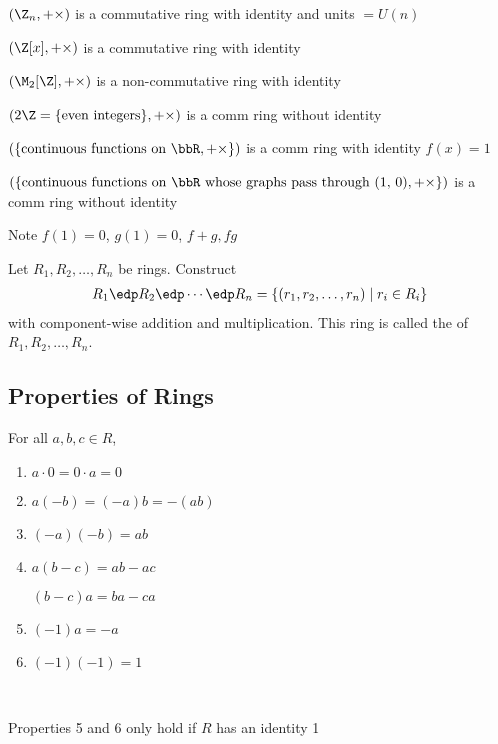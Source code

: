 \begin{example}
  \((\Z_n, +\times)\) is a commutative ring with identity and units \(=U(n)\)
\end{example}

\begin{example}
  \((\Z[x], +\times)\) is a commutative ring with identity
\end{example}

\begin{example}
  \((\M_2[\Z], +\times)\) is a non-commutative ring with identity
\end{example}

\begin{example}
  \((2\Z = \{\text{even integers}\}, +\times)\) is a comm ring without identity
\end{example}

\begin{example}
  \((\{\text{continuous functions on \bbR}, +\times\})\) is a comm ring with identity \(f(x) = 1\)
\end{example}

\begin{example}
  \((\{\text{continuous functions on \bbR\ whose graphs pass through (1, 0)}, +\times\})\) is a comm ring without identity

  Note \(f(1) = 0\), \(g(1) = 0\), \(f+g, fg\)
\end{example}

\begin{example}
  Let \(R_1, R_2, \ldots, R_n\) be rings. Construct
  \begin{align*}
    R_1\edp R_2\edp \cdots \edp R_n = \{(r_1, r_2, \ldots, r_n) \mid r_i\in R_i\}
  \end{align*}
  with component-wise addition and multiplication. This ring is called the  of \(R_1, R_2, \ldots, R_n\).
\end{example}

\subsection{Properties of Rings}

\begin{theorem}
  For all \(a,b,c\in R\),
\begin{enumerate}
  \item \(a\cdot 0 = 0\cdot a = 0\)
  \item \(a(-b) = (-a)b = -(ab)\)
  \item \((-a)(-b)=ab\)
  \item \(a(b-c) = ab-ac\)

  \((b-c)a = ba-ca\)
  \item \((-1)a = -a\)
  \item \((-1)(-1) = 1\)
\end{enumerate}\

\begin{note}
Properties 5 and 6 only hold if \(R\) has an identity 1
\end{note}
\end{theorem}

